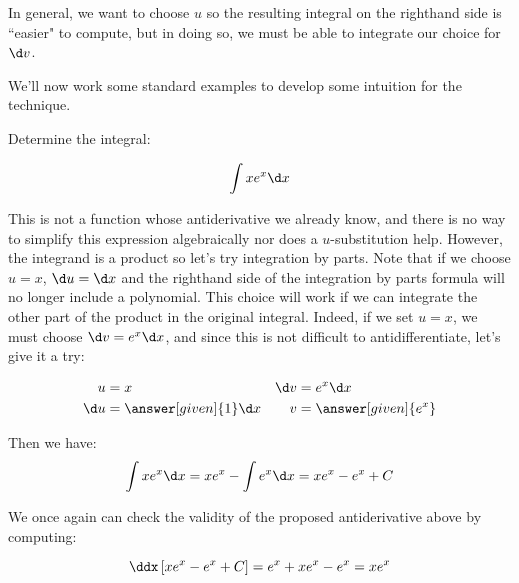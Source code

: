 \documentclass{ximera}
\begin{document}
In general, we want to choose $u$ so the resulting integral on the righthand side is ``easier" to compute, but in doing so, we must be able to integrate our choice for $\d v$.

We'll now work some standard examples to develop some intuition for the technique.


\begin{example}
Determine the integral:

\[
\int xe^{x} \d x
\]

\begin{explanation}
This is not a function whose antiderivative we already know, and there is no way to simplify this expression algebraically nor does a $u$-substitution help.  However, the integrand is a product so let's try integration by parts.  Note that if we choose $u=x$, $\d u = \d x$ and the righthand side of the integration by parts formula will no longer include a polynomial.  This choice will work if we can integrate the other part of the product in the original integral.  Indeed, if we set $u=x$, we must choose $\d v=e^{x} \d x$, and since this is not difficult to antidifferentiate, let's give it a try:

\begin{align*}
u &= x & \d v & = e^x \d x \\
 \d u &= \answer[given]{1} \d x & v&= \answer[given]{e^x}
\end{align*}

Then we have:
\[
\int xe^{x} \d x= xe^{x}-\int e^{x} \d x=xe^{x}-e^{x} + C
\]

\end{explanation}

We once again can check the validity of the proposed antiderivative above by computing:

\[
\ddx \left[xe^{x}-e^{x} + C\right] = e^x+xe^x -e^x = xe^x
\]

\end{example}
\end{document}
